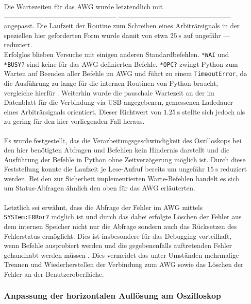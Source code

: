\documentclass[../Report.tex]{subfiles}
\begin{document}
Die Wartezeiten für das AWG wurde letztendlich mit
--------------------------------------------------
--------------------------------------------------
angepasst. Die Laufzeit der Routine zum Schreiben eines Arbiträrsignals in der speziellen hier geforderten Form wurde damit von etwa $\SI{25}{\s}$ auf ungefähr --- reduziert.
\\
Erfolglos blieben Versuche mit einigen anderen Standardbefehlen.
\lstinline{*WAI} und \lstinline{*BUSY?} sind keine für das AWG definierten Befehle.
\lstinline{*OPC?} zwingt Python zum Warten auf Beenden aller Befehle im AWG und führt zu einem \lstinline{TimeoutError}, da die Ausführung zu lange für die internen Routinen von Python braucht, vergleiche hierfür \cite[S. 9]{troeser13}.
Weiterhin wurde die pauschale Wartezeit an der im Datenblatt \cite[S. 21]{keysData14} für die Verbindung via USB angegebenen, gemessenen Ladedauer eines Arbiträrsignals orientiert. Dieser Richtwert von $\SI{1.25}{\s}$ stellte sich jedoch als zu gering für den hier vorliegenden Fall heraus.
\\
\\
Es wurde festgestellt, das die Verarbeitungsgeschwindigkeit des Oszilloskops bei den hier benötigten Abfragen und Befehlen kein Hindernis darstellt und die Ausführung der Befehle in Python ohne Zeitverzögerung möglich ist. Durch diese Feststellung konnte die Laufzeit je Lese-Aufruf bereits um ungefähr $\SI{15}{\s}$ reduziert werden.
Bei den zur Sicherheit implementierten Warte-Befehlen handelt es sich um Status-Abfragen ähnlich den oben für das AWG erläuterten.
\\
\\
Letztlich sei erwähnt, dass die Abfrage der Fehler im AWG mittels  \lstinline{SYSTem:ERRor?} möglich ist und durch das dabei erfolgte Löschen der Fehler aus dem internen Speicher nicht nur die Abfrage sondern auch das Rücksetzen des Fehlerstatus ermöglicht. Dies ist insbesondere für das Debugging vorteilhaft, wenn Befehle ausprobiert werden und die gegebenenfalls auftretenden Fehler gehandhabt werden müssen \cite[S. 454]{keysHand15}. Dies vermeidet das unter Umständen mehrmalige Trennen und Wiederherstellen der Verbindung zum AWG sowie das Löschen der Fehler an der Benutzeroberfläche.

\subsubsection{Anpassung der horizontalen Auflösung am Oszilloskop}
\end{document}
